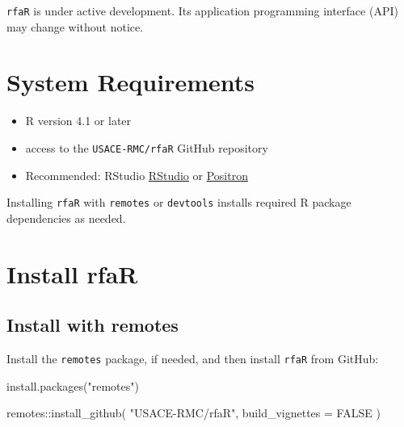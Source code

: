 \documentclass[
  letterpaper,
  DIV=11,
  numbers=noendperiod]{scrreprt}
\newenvironment{Shaded}{\begin{snugshade}}{\end{snugshade}}
\newcommand{\AttributeTok}[1]{\textcolor[rgb]{0.40,0.45,0.13}{#1}}
\newcommand{\ConstantTok}[1]{\textcolor[rgb]{0.56,0.35,0.01}{#1}}
\newcommand{\FunctionTok}[1]{\textcolor[rgb]{0.28,0.35,0.67}{#1}}
\newcommand{\NormalTok}[1]{\textcolor[rgb]{0.00,0.23,0.31}{#1}}
\newcommand{\SpecialCharTok}[1]{\textcolor[rgb]{0.37,0.37,0.37}{#1}}
\newcommand{\StringTok}[1]{\textcolor[rgb]{0.13,0.47,0.30}{#1}}
\providecommand{\tightlist}{%
  \setlength{\itemsep}{0pt}\setlength{\parskip}{0pt}}
\begin{document}
\begin{tcolorbox}[enhanced jigsaw, arc=.35mm, bottomrule=.15mm, bottomtitle=1mm, breakable, colback=white, colbacktitle=quarto-callout-warning-color!10!white, colframe=quarto-callout-warning-color-frame, coltitle=black, left=2mm, leftrule=.75mm, opacityback=0, opacitybacktitle=0.6, rightrule=.15mm, title=\textcolor{quarto-callout-warning-color}{\faExclamationTriangle}\hspace{0.5em}{Warning}, titlerule=0mm, toprule=.15mm, toptitle=1mm]

\texttt{rfaR} is under active development. Its application programming
interface (API) may change without notice.

\end{tcolorbox}

\section{System Requirements}\label{system-requirements}

\begin{itemize}
\tightlist
\item
  R version 4.1 or later
\item
  access to the \texttt{USACE-RMC/rfaR} GitHub repository
\item
  Recommended: RStudio
  \href{https://posit.co/products/open-source/rstudio}{RStudio} or
  \href{https://positron.posit.co/}{Positron}
\end{itemize}

Installing \texttt{rfaR} with \texttt{remotes} or \texttt{devtools}
installs required R package dependencies as needed.

\section{Install rfaR}\label{install-rfar}

\subsection{Install with remotes}\label{install-with-remotes}

Install the \texttt{remotes} package, if needed, and then install
\texttt{rfaR} from GitHub:

\begin{Shaded}
\begin{Highlighting}[]
\FunctionTok{install.packages}\NormalTok{(}\StringTok{"remotes"}\NormalTok{)}

\NormalTok{remotes}\SpecialCharTok{::}\FunctionTok{install\_github}\NormalTok{(}
  \StringTok{"USACE{-}RMC/rfaR"}\NormalTok{,}
  \AttributeTok{build\_vignettes =} \ConstantTok{FALSE}
\NormalTok{)}
\end{Highlighting}
\end{Shaded}
\end{document}
